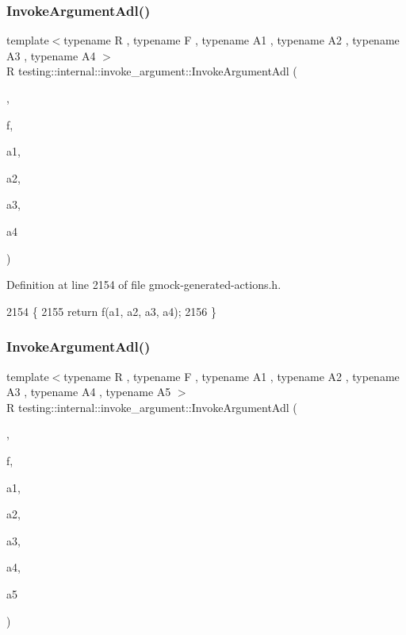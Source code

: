 \subsubsection{\texorpdfstring{Invoke\+Argument\+Adl()}{InvokeArgumentAdl()}\hspace{0.1cm}{\footnotesize\ttfamily [5/11]}}
{\footnotesize\ttfamily template$<$typename R , typename F , typename A1 , typename A2 , typename A3 , typename A4 $>$ \\
R testing\+::internal\+::invoke\+\_\+argument\+::\+Invoke\+Argument\+Adl (\begin{DoxyParamCaption}\item[{\hyperlink{structtesting_1_1internal_1_1invoke__argument_1_1AdlTag}{Adl\+Tag}}]{,  }\item[{F}]{f,  }\item[{A1}]{a1,  }\item[{A2}]{a2,  }\item[{A3}]{a3,  }\item[{A4}]{a4 }\end{DoxyParamCaption})}



Definition at line 2154 of file gmock-\/generated-\/actions.\+h.


\begin{DoxyCode}
2154                                                              \{
2155   \textcolor{keywordflow}{return} f(a1, a2, a3, a4);
2156 \}
\end{DoxyCode}
\mbox{\label{namespacetesting_1_1internal_1_1invoke__argument_a371c08ae03d150520e8bda58fb4574c3}} 
\subsubsection{\texorpdfstring{Invoke\+Argument\+Adl()}{InvokeArgumentAdl()}\hspace{0.1cm}{\footnotesize\ttfamily [6/11]}}
{\footnotesize\ttfamily template$<$typename R , typename F , typename A1 , typename A2 , typename A3 , typename A4 , typename A5 $>$ \\
R testing\+::internal\+::invoke\+\_\+argument\+::\+Invoke\+Argument\+Adl (\begin{DoxyParamCaption}\item[{\hyperlink{structtesting_1_1internal_1_1invoke__argument_1_1AdlTag}{Adl\+Tag}}]{,  }\item[{F}]{f,  }\item[{A1}]{a1,  }\item[{A2}]{a2,  }\item[{A3}]{a3,  }\item[{A4}]{a4,  }\item[{A5}]{a5 }\end{DoxyParamCaption})}



